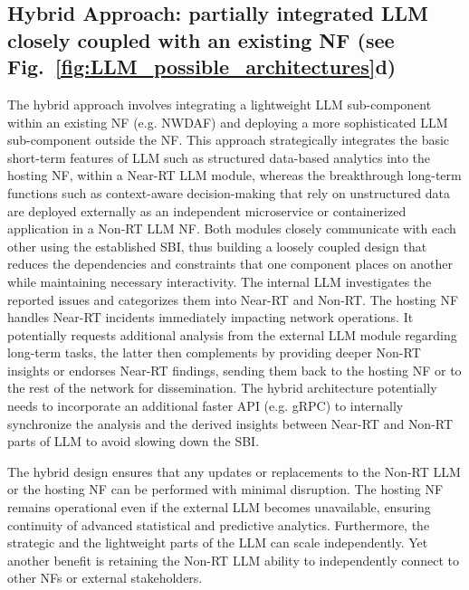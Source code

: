 \subsection{Hybrid Approach: partially integrated \gls{LLM} closely coupled with an existing \gls{NF} (see Fig.~\ref{fig:LLM_possible_architectures}d)}
\label{subsec:hybrid_llm}
The hybrid approach involves integrating a lightweight \gls{LLM} sub-component within an existing \gls{NF} (e.g. \gls{NWDAF}) and deploying a more sophisticated \gls{LLM} sub-component outside the \gls{NF}. This approach strategically integrates the basic short-term features of \gls{LLM} such as structured data-based analytics into the hosting \gls{NF}, within a \gls{Near-RT} \gls{LLM} module, whereas the breakthrough long-term functions such as context-aware decision-making that rely on unstructured data are deployed externally as an independent microservice or containerized application in a \gls{Non-RT} \gls{LLM} \gls{NF}. Both modules closely communicate with each other using the established \gls{SBI}, thus building a loosely coupled design \cite{chaoub2023hybrid} that reduces the dependencies and constraints that one component places on another while maintaining necessary interactivity. The internal \gls{LLM} investigates the reported issues and categorizes them into \gls{Near-RT} and \gls{Non-RT}. The hosting \gls{NF} handles \gls{Near-RT} incidents immediately impacting network operations. It potentially requests additional analysis from the external \gls{LLM} module regarding long-term tasks, the latter then complements by providing deeper \gls{Non-RT} insights or endorses \gls{Near-RT} findings, sending them back to the hosting \gls{NF} or to the rest of the network for dissemination. The hybrid architecture potentially needs to incorporate an additional faster API (e.g. gRPC) to internally synchronize the analysis and the derived insights between \gls{Near-RT} and \gls{Non-RT} parts of \gls{LLM} to avoid slowing down the \gls{SBI}.

The hybrid design ensures that any updates or replacements to the \gls{Non-RT} \gls{LLM} or the hosting \gls{NF} can be performed with minimal disruption. The hosting \gls{NF} remains operational even if the external \gls{LLM} becomes unavailable, ensuring continuity of advanced statistical and predictive analytics. Furthermore, the strategic and the lightweight parts of the \gls{LLM} can scale independently. Yet another benefit is retaining the \gls{Non-RT} \gls{LLM} ability to independently connect to other \glspl{NF} or external stakeholders.

